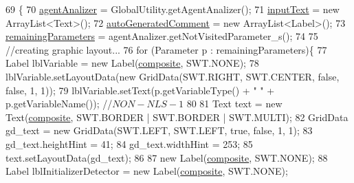 \begin{DoxyCode}
69                                  \{
70         \hyperlink{classit_1_1isislab_1_1masonassisteddocumentation_1_1mason_1_1wizards_1_1_f___agent_variables_page_a7201c89fcb48630684629ccea3c39de4}{agentAnalizer} = GlobalUtility.getAgentAnalizer();  
71         \hyperlink{classit_1_1isislab_1_1masonassisteddocumentation_1_1mason_1_1wizards_1_1_f___agent_variables_page_a4bec9c841bd5ecadb3a8780469cb0f3a}{inputText} = \textcolor{keyword}{new} ArrayList<Text>();
72         \hyperlink{classit_1_1isislab_1_1masonassisteddocumentation_1_1mason_1_1wizards_1_1_f___agent_variables_page_a5256a71ed3e45356ac900afc1b75c1f2}{autoGeneratedComment} = \textcolor{keyword}{new} ArrayList<Label>();
73         \hyperlink{classit_1_1isislab_1_1masonassisteddocumentation_1_1mason_1_1wizards_1_1_f___agent_variables_page_a84c4e7c9e38a660e5befa94f5cac893f}{remainingParameters} = agentAnalizer.getNotVisitedParameter\_s();
74         
75         \textcolor{comment}{//creating graphic layout...}
76         \textcolor{keywordflow}{for} (Parameter p : remainingParameters)\{
77             Label lblVariable = \textcolor{keyword}{new} Label(\hyperlink{classit_1_1isislab_1_1masonassisteddocumentation_1_1mason_1_1wizards_1_1_f___agent_variables_page_ae1c0cb2824f39253ba724603c4ba6920}{composite}, SWT.NONE);
78             lblVariable.setLayoutData(\textcolor{keyword}{new} GridData(SWT.RIGHT, SWT.CENTER, \textcolor{keyword}{false}, \textcolor{keyword}{false}, 1, 1));
79             lblVariable.setText(p.getVariableType() + \textcolor{stringliteral}{" "} + p.getVariableName()); \textcolor{comment}{//$NON-NLS-1$}
80             
81             Text text = \textcolor{keyword}{new} Text(\hyperlink{classit_1_1isislab_1_1masonassisteddocumentation_1_1mason_1_1wizards_1_1_f___agent_variables_page_ae1c0cb2824f39253ba724603c4ba6920}{composite}, SWT.BORDER | SWT.BORDER | SWT.MULTI);
82             GridData gd\_text = \textcolor{keyword}{new} GridData(SWT.LEFT, SWT.LEFT, \textcolor{keyword}{true}, \textcolor{keyword}{false}, 1, 1);
83             gd\_text.heightHint = 41;
84             gd\_text.widthHint = 253;
85             text.setLayoutData(gd\_text);
86 
87             \textcolor{keyword}{new} Label(\hyperlink{classit_1_1isislab_1_1masonassisteddocumentation_1_1mason_1_1wizards_1_1_f___agent_variables_page_ae1c0cb2824f39253ba724603c4ba6920}{composite}, SWT.NONE);        
88             Label lblInitializerDetector = \textcolor{keyword}{new} Label(\hyperlink{classit_1_1isislab_1_1masonassisteddocumentation_1_1mason_1_1wizards_1_1_f___agent_variables_page_ae1c0cb2824f39253ba724603c4ba6920}{composite}, SWT.NONE);

\end{DoxyCode}
